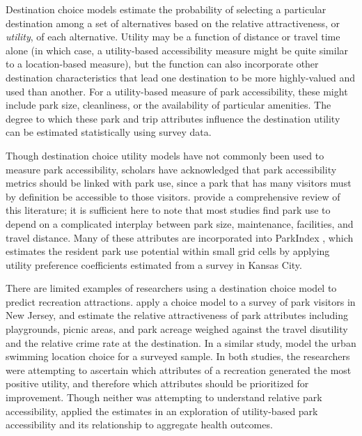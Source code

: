 \documentclass[3p, authoryear, review, doubleblind]{elsarticle} %
\begin{document}
Destination choice models estimate the probability of selecting a particular
destination among a set of alternatives based on the relative attractiveness, or
\emph{utility}, of each alternative. Utility may be a function of distance or travel
time alone (in which case, a utility-based accessibility measure might be quite
similar to a location-based measure), but the function can also incorporate
other destination characteristics that lead one destination to be more
highly-valued and used than another. For a utility-based measure of park accessibility,
these might include park size, cleanliness, or the availability of particular
amenities. The degree to which these park and trip attributes influence the
destination utility can be estimated statistically using survey data.

Though destination choice utility models have not commonly been used to measure
park accessibility, scholars have acknowledged that park accessibility metrics
should be linked with park use, since a park that has many visitors must by
definition be accessible to those visitors. \citet{McCormack2010} provide a
comprehensive review of this literature; it is sufficient here to note that most
studies find park use to depend on a complicated interplay between park size,
maintenance, facilities, and travel distance. Many of these attributes are
incorporated into ParkIndex \citep{Kaczynski2016}, which estimates the resident park
use potential within small grid cells by applying utility preference
coefficients estimated from a survey in Kansas City.

There are limited examples of researchers using a destination choice model to
predict recreation attractions. \citet{Kinnell2006} apply a choice model to a survey of
park visitors in New Jersey, and estimate the relative attractiveness of park
attributes including playgrounds, picnic areas, and park acreage weighed against
the travel disutility and the relative crime rate at the destination. In a
similar study, \citet{Meyerhoff2010} model the urban swimming location choice for a
surveyed sample. In both studies, the researchers were attempting to ascertain
which attributes of a recreation generated the most positive utility, and
therefore which attributes should be prioritized for improvement. Though neither
was attempting to understand relative park accessibility, \citet{macfarlaneNYC} applied
the \citet{Kinnell2006} estimates in an exploration of utility-based park accessibility
and its relationship to aggregate health outcomes.
\end{document}
